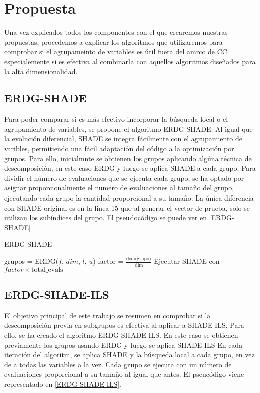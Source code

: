 
\chapter{Propuesta}

Una vez explicados todos los componentes con el que crearemos nuestras propuestas, procedemos a explicar los algoritmos que utilizaremos para comprobar si el agrupameinto de variables es útil fuera del amrco de CC especialemente si es efectiva al combinarla con aquellos algoritmos diseñados para la alta dimensionalidad.

\section{ERDG-SHADE}

Para poder comparar si es más efectivo incorporar la búsqueda local o el agrupamiento de variables, se propone el algoritmo ERDG-SHADE. Al igual que la evolución diferencial, SHADE se integra fácilmente con el agrupamiento de varibles, permitiendo una fácil adaptación del código a la optimización por grupos. Para ello, inicialmnte se obtienen los grupos aplicando algúna técnica de descomposición, en este caso ERDG y luego se aplica SHADE a cada grupo. Para dividir el número de evaluaciones que se ejecuta cada grupo, se ha optado por asignar proporcionalmente el numero de evaluaciones al tamaño del grupo, ejecutando cada grupo la cantidad proporcional a su tamaño. La única diferencia con SHADE original es en la linea 15 que al generar el vector de prueba, solo se utilizan los subíndices del grupo. El pseudocódigo se puede ver en \ref{ERDG-SHADE}

\begin{algorithm}
\caption{ERDG-SHADE}
\label{ERDG-SHADE}
\begin{algorithmic}[1]
\STATE grupos = ERDG($f$, $dim$, $l$, $u$)
    \STATE factor = $\frac{\text{dim(grupo)}}{\text{dim}}$
    \STATE Ejecutar SHADE con $factor \times \text{total\_evals}$
\ENDFOR
\end{algorithmic}
\end{algorithm}

 

\section{ERDG-SHADE-ILS}

El objetivo principal de este trabajo se resumen en comprobar si la descomposición previa en subgrupos es efectiva al aplicar a SHADE-ILS. Para ello, se ha creado el algoritmo ERDG-SHADE-ILS. En este caso se obtienen previamente los grupos usando ERDG y luego se aplica SHADE-ILS En cada iteración del algoritm, se aplica SHADE y la búsqueda local a cada grupo, en vez de a todas las variables a la vez. Cada grupo se ejecuta con un número de evaluaciones proporcional a su tamaño al igual que antes. El pseucódigo viene representado en \ref{ERDG-SHADE-ILS}.

